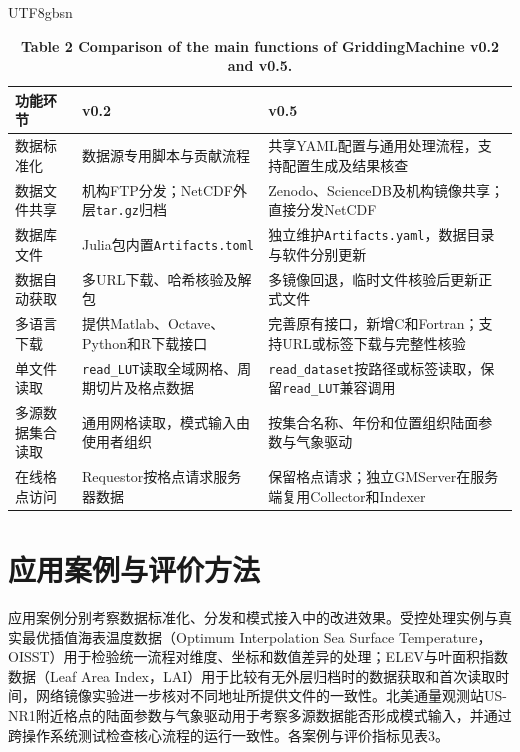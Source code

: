\documentclass[numdoi]{chinese}
\newlength{\gmTableWidth}
\begin{document}
\begin{CJK}{UTF8}{gbsn}
\begin{table}[!htbp]\centering
\begingroup\singlespacing\small\setlength{\tabcolsep}{9pt}\renewcommand{\arraystretch}{1.12}
\captionsetup{justification=centering}
\setlength{\gmTableWidth}{\dimexpr\linewidth-4\tabcolsep\relax}
\caption*{\textbf{表2 GriddingMachine v0.2与v0.5的主要功能比较}}
\caption*{\textbf{Table 2 Comparison of the main functions of GriddingMachine v0.2 and v0.5.}}
\begin{tabular}{@{}>{\raggedright\arraybackslash}p{0.17\gmTableWidth}>{\raggedright\arraybackslash}p{0.36\gmTableWidth}>{\raggedright\arraybackslash}p{0.47\gmTableWidth}@{}}
\toprule
\textbf{功能环节} & \textbf{v0.2} & \textbf{v0.5} \\
\midrule
数据标准化 & 数据源专用脚本与贡献流程 & 共享YAML配置与通用处理流程，支持配置生成及结果核查 \\
\midrule[0.25pt]
数据文件共享 & 机构FTP分发；NetCDF外层\nolinkurl{tar.gz}归档 & Zenodo、\allowbreak{}ScienceDB及机构镜像共享；直接分发NetCDF \\
\midrule[0.25pt]
数据库文件 & Julia包内置\nolinkurl{Artifacts.toml} & 独立维护\nolinkurl{Artifacts.yaml}，数据目录与软件分别更新 \\
\midrule[0.25pt]
数据自动获取 & 多URL下载、\allowbreak{}哈希核验及解包 & 多镜像回退，临时文件核验后更新正式文件 \\
\midrule[0.25pt]
多语言下载 & 提供Matlab、\allowbreak{}Octave、\allowbreak{}Python和R下载接口 & 完善原有接口，新增C和Fortran；支持URL或标签下载与完整性核验 \\
\midrule[0.25pt]
单文件读取 & \nolinkurl{read_LUT}读取全域网格、\allowbreak{}周期切片及格点数据 & \nolinkurl{read_dataset}按路径或标签读取，保留\nolinkurl{read_LUT}兼容调用 \\
\midrule[0.25pt]
多源数据集合读取 & 通用网格读取，模式输入由使用者组织 & 按集合名称、\allowbreak{}年份和位置组织陆面参数与气象驱动 \\
\midrule[0.25pt]
在线格点访问 & Requestor按格点请求服务器数据 & 保留格点请求；独立GMServer在服务端复用Collector和Indexer \\
\bottomrule
\end{tabular}
\endgroup
\label{tab:2}
\end{table}
\FloatBarrier

\section{应用案例与评价方法}
应用案例分别考察数据标准化、分发和模式接入中的改进效果。受控处理实例与真实最优插值海表温度数据（Optimum Interpolation Sea Surface Temperature，OISST）用于检验统一流程对维度、坐标和数值差异的处理；ELEV与叶面积指数数据（Leaf Area Index，LAI）用于比较有无外层归档时的数据获取和首次读取时间，网络镜像实验进一步核对不同地址所提供文件的一致性。北美通量观测站US-NR1附近格点的陆面参数与气象驱动用于考察多源数据能否形成模式输入，并通过跨操作系统测试检查核心流程的运行一致性。各案例与评价指标见表3。


\end{CJK}
\end{document}
